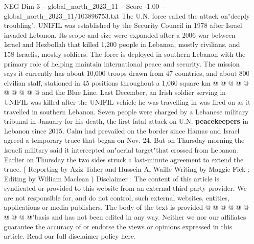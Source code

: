 \begin{textsample}{NEG Dim 3 – global\_north\_2023\_11 – Score -1.00 – global\_north\_2023\_11/103896753.txt}
The U.N. force called the attack on"deeply troubling".
UNIFIL was established by the Security Council in 1978 after Israel invaded Lebanon.
Its scope and size were expanded after a 2006 war between Israel and Hezbollah that killed 1,200 people in Lebanon, mostly civilians, and 158 Israelis, mostly soldiers.
The force is deployed in southern Lebanon with the primary role of helping maintain international peace and security.
The mission says it currently has about 10,000 troops drawn from 47 countries, and about 800 civilian staff, stationed in 45 positions throughout a 1,060 square km @ @ @ @ @ @ @ @ @ @ and the Blue Line.
Last December, an Irish soldier serving in UNIFIL was killed after the UNIFIL vehicle he was travelling in was fired on as it travelled in southern Lebanon.
Seven people were charged by a Lebanese military tribunal in January for his death, the first fatal attack on U.N. \textbf{peacekeepers} in Lebanon since 2015.
Calm had prevailed on the border since Hamas and Israel agreed a temporary truce that began on Nov. 24.
But on Thursday morning the Israeli military said it intercepted an"aerial target"that crossed from Lebanon.
Earlier on Thursday the two sides struck a last-minute agreement to extend the truce. ( Reporting by Aziz Taher and Hussein Al Waille Writing by Maggie Fick ; Editing by William Maclean ) Disclaimer : The content of this article is syndicated or provided to this website from an external third party provider.
We are not responsible for, and do not control, such external websites, entities, applications or media publishers.
The body of the text is provided @ @ @ @ @ @ @ @ @ @"basis and has not been edited in any way.
Neither we nor our affiliates guarantee the accuracy of or endorse the views or opinions expressed in this article.
Read our full disclaimer policy here.

\end{textsample}
